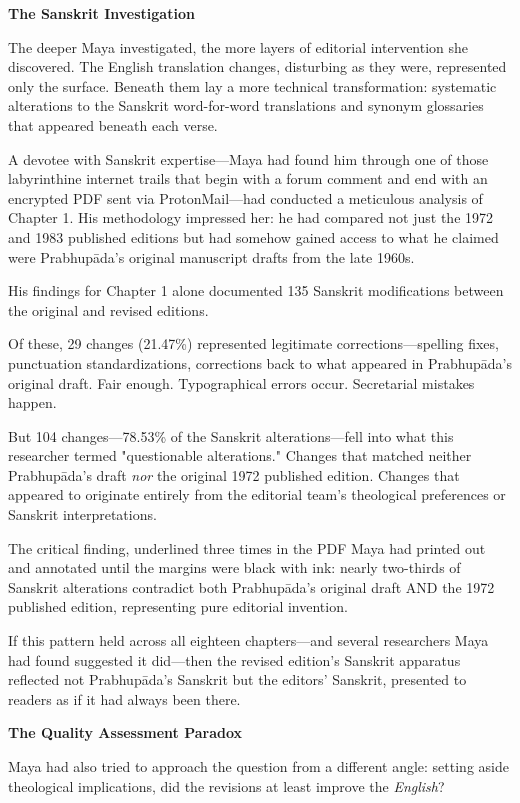 \documentclass[12pt,twoside]{book}
\begin{document}
\textbf{\textbf{The Sanskrit Investigation}}

The deeper Maya investigated, the more layers of editorial intervention she discovered. The English translation changes, disturbing as they were, represented only the surface. Beneath them lay a more technical transformation: systematic alterations to the Sanskrit word-for-word translations and synonym glossaries that appeared beneath each verse.

A devotee with Sanskrit expertise—Maya had found him through one of those labyrinthine internet trails that begin with a forum comment and end with an encrypted PDF sent via ProtonMail—had conducted a meticulous analysis of Chapter 1. His methodology impressed her: he had compared not just the 1972 and 1983 published editions but had somehow gained access to what he claimed were Prabhupāda's original manuscript drafts from the late 1960s.

His findings for Chapter 1 alone documented 135 Sanskrit modifications between the original and revised editions.

Of these, 29 changes (21.47\%) represented legitimate corrections—spelling fixes, punctuation standardizations, corrections back to what appeared in Prabhupāda's original draft. Fair enough. Typographical errors occur. Secretarial mistakes happen.

But 104 changes—78.53\% of the Sanskrit alterations—fell into what this researcher termed "questionable alterations." Changes that matched neither Prabhupāda's draft \emph{nor} the original 1972 published edition. Changes that appeared to originate entirely from the editorial team's theological preferences or Sanskrit interpretations.

The critical finding, underlined three times in the PDF Maya had printed out and annotated until the margins were black with ink: nearly two-thirds of Sanskrit alterations contradict both Prabhupāda's original draft AND the 1972 published edition, representing pure editorial invention.

If this pattern held across all eighteen chapters—and several researchers Maya had found suggested it did—then the revised edition's Sanskrit apparatus reflected not Prabhupāda's Sanskrit but the editors' Sanskrit, presented to readers as if it had always been there.

\textbf{\textbf{The Quality Assessment Paradox}}

Maya had also tried to approach the question from a different angle: setting aside theological implications, did the revisions at least improve the \emph{English}?
\end{document}
